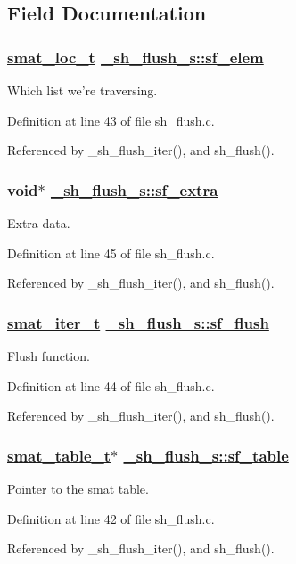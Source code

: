 \subsection{Field Documentation}
\hypertarget{struct__sh__flush__s_o1}{
\subsubsection[sf\_\-elem]{\setlength{\rightskip}{0pt plus 5cm}\hyperlink{group__dbprim__smat_ga6}{smat\_\-loc\_\-t} \hyperlink{struct__sh__flush__s_o1}{\_\-sh\_\-flush\_\-s::sf\_\-elem}}}
\label{struct__sh__flush__s_o1}


Which list we're traversing. 

Definition at line 43 of file sh\_\-flush.c.

Referenced by \_\-sh\_\-flush\_\-iter(), and sh\_\-flush().\hypertarget{struct__sh__flush__s_o3}{
\subsubsection[sf\_\-extra]{\setlength{\rightskip}{0pt plus 5cm}void$\ast$ \hyperlink{struct__sh__flush__s_o3}{\_\-sh\_\-flush\_\-s::sf\_\-extra}}}
\label{struct__sh__flush__s_o3}


Extra data. 

Definition at line 45 of file sh\_\-flush.c.

Referenced by \_\-sh\_\-flush\_\-iter(), and sh\_\-flush().\hypertarget{struct__sh__flush__s_o2}{
\subsubsection[sf\_\-flush]{\setlength{\rightskip}{0pt plus 5cm}\hyperlink{group__dbprim__smat_ga4}{smat\_\-iter\_\-t} \hyperlink{struct__sh__flush__s_o2}{\_\-sh\_\-flush\_\-s::sf\_\-flush}}}
\label{struct__sh__flush__s_o2}


Flush function. 

Definition at line 44 of file sh\_\-flush.c.

Referenced by \_\-sh\_\-flush\_\-iter(), and sh\_\-flush().\hypertarget{struct__sh__flush__s_o0}{
\subsubsection[sf\_\-table]{\setlength{\rightskip}{0pt plus 5cm}\hyperlink{struct__smat__table__s}{smat\_\-table\_\-t}$\ast$ \hyperlink{struct__sh__flush__s_o0}{\_\-sh\_\-flush\_\-s::sf\_\-table}}}
\label{struct__sh__flush__s_o0}


Pointer to the smat table. 

Definition at line 42 of file sh\_\-flush.c.

Referenced by \_\-sh\_\-flush\_\-iter(), and sh\_\-flush().